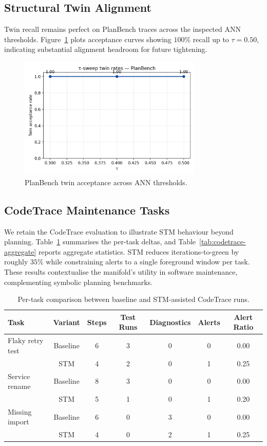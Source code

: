 \documentclass[11pt]{article}
\begin{document}
\subsection{Structural Twin Alignment}
Twin recall remains perfect on PlanBench traces across the inspected ANN
thresholds. Figure~\ref{fig:tau-planbench} plots acceptance curves showing $100\%$
recall up to $\tau=0.50$, indicating substantial alignment headroom for future
tightening.

\begin{figure}[h]
  \centering
  \includegraphics[width=0.78\textwidth]{../note/fig_tau_sweep_planbench.png}
  \caption{PlanBench twin acceptance across ANN thresholds.}
  \label{fig:tau-planbench}
\end{figure}

\subsection{CodeTrace Maintenance Tasks}
We retain the CodeTrace evaluation to illustrate STM behaviour beyond planning.
Table~\ref{tab:codetrace-per-task} summarises the per-task deltas, and
Table~\ref{tab:codetrace-aggregate} reports aggregate statistics. STM reduces
iterations-to-green by roughly $35\%$ while constraining alerts to a single
foreground window per task. These results contextualise the manifold's utility in
software maintenance, complementing symbolic planning benchmarks.

\begin{table}[h]
  \centering
  \caption{Per-task comparison between baseline and STM-assisted CodeTrace runs.}
  \label{tab:codetrace-per-task}
  \begin{tabular}{lcccccc}
    \toprule
    Task & Variant & Steps & Test Runs & Diagnostics & Alerts & Alert Ratio \\
    \midrule
    Flaky retry test & Baseline & 6 & 3 & 0 & 0 & 0.00 \\
                      & STM & 4 & 2 & 0 & 1 & 0.25 \\
    Service rename & Baseline & 8 & 3 & 0 & 0 & 0.00 \\
                   & STM & 5 & 1 & 0 & 1 & 0.20 \\
    Missing import & Baseline & 6 & 0 & 3 & 0 & 0.00 \\
                   & STM & 4 & 0 & 2 & 1 & 0.25 \\
    \bottomrule
  \end{tabular}
\end{table}
\end{document}
